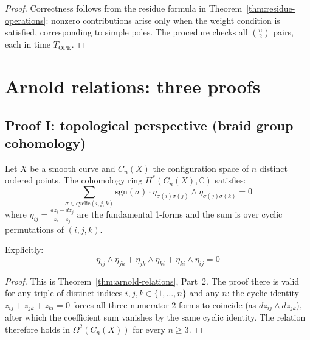 \begin{proof}
Correctness follows from the residue formula in Theorem~\ref{thm:residue-operations}: nonzero contributions arise only when the weight condition is satisfied, corresponding to simple poles.  The procedure checks all $\binom{n}{2}$ pairs, each in time $T_{\mathrm{OPE}}$.
\end{proof}

\section{Arnold relations: three proofs}
\label{sec:arnold-three-proofs-comprehensive}
\label{sec:arnold-chiral}

\subsection{Proof I: topological perspective (braid group cohomology)}
\label{sec:arnold-proof-topological}

\begin{theorem}
\label{thm:arnold-topological}
Let $X$ be a smooth curve and $C_n(X)$ the configuration space of $n$ distinct ordered 
points. The cohomology ring $H^*(C_n(X), \mathbb{C})$ satisfies:
\begin{equation}
\sum_{\sigma \in \text{cyclic}(i,j,k)} \text{sgn}(\sigma) \cdot \eta_{\sigma(i)\sigma(j)} 
\wedge \eta_{\sigma(j)\sigma(k)} = 0
\end{equation}
where $\eta_{ij} = \frac{dz_i - dz_j}{z_i - z_j}$ are the fundamental 1-forms and the 
sum is over cyclic permutations of $(i,j,k)$.

Explicitly:
\begin{equation}
\eta_{ij} \wedge \eta_{jk} + \eta_{jk} \wedge \eta_{ki} + \eta_{ki} \wedge 
\eta_{ij} = 0
\end{equation}
\end{theorem}

\begin{proof}
This is Theorem~\ref{thm:arnold-relations}, Part~2.  The proof there is valid for any triple of distinct indices $i,j,k \in \{1,\ldots,n\}$ and any $n$: the cyclic identity $z_{ij} + z_{jk} + z_{ki} = 0$ forces all three numerator $2$-forms to coincide (as $dz_{ij} \wedge dz_{jk}$), after which the coefficient sum vanishes by the same cyclic identity.  The relation therefore holds in $\Omega^2(C_n(X))$ for every $n \geq 3$.
\end{proof}

